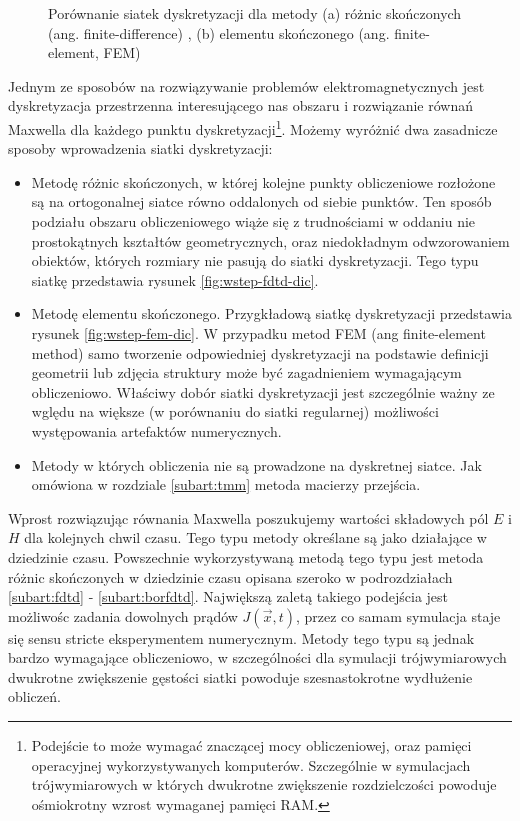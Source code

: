\begin{figure}[tb]
\begin{subfigure}{0.45\textwidth}
	\end{subfigure}
	\caption{Porównanie siatek dyskretyzacji dla metody (a) różnic skończonych (ang. finite-difference) , (b) elementu skończonego (ang. finite-element, FEM)}
\end{figure}

Jednym ze sposobów na rozwiązywanie problemów elektromagnetycznych jest dyskretyzacja przestrzenna interesującego nas obszaru i rozwiązanie równań Maxwella dla każdego punktu dyskretyzacji\footnote{Podejście to może wymagać znaczącej mocy obliczeniowej, oraz pamięci operacyjnej wykorzystywanych komputerów. Szczególnie w symulacjach trójwymiarowych w których dwukrotne zwiększenie rozdzielczości powoduje ośmiokrotny wzrost wymaganej pamięci RAM. }. Możemy wyróżnić dwa zasadnicze sposoby wprowadzenia siatki dyskretyzacji:
\begin{itemize}
\item Metodę różnic skończonych, w której kolejne punkty obliczeniowe rozłożone są na ortogonalnej siatce równo oddalonych od siebie punktów. Ten sposób podziału obszaru obliczeniowego wiąże się z trudnościami w oddaniu nie prostokątnych kształtów geometrycznych, oraz niedokładnym odwzorowaniem obiektów, których rozmiary nie pasują do siatki dyskretyzacji. Tego typu siatkę przedstawia rysunek \ref{fig:wstep-fdtd-dic}.
\item Metodę elementu skończonego. Przygkładową siatkę dyskretyzacji przedstawia rysunek \ref{fig:wstep-fem-dic}. W przypadku metod  FEM (ang finite-element method) samo tworzenie odpowiedniej dyskretyzacji na podstawie definicji geometrii lub zdjęcia struktury może być zagadnieniem wymagającym obliczeniowo. Właściwy dobór siatki dyskretyzacji jest szczególnie ważny ze wględu na większe (w porównaniu do siatki regularnej) możliwości występowania artefaktów numerycznych.  
\item Metody w których obliczenia nie są prowadzone na dyskretnej siatce. Jak omówiona w rozdziale \ref{subart:tmm} metoda macierzy przejścia.
\end{itemize}

Wprost rozwiązując równania Maxwella poszukujemy wartości składowych pól $E$ i $H$ dla kolejnych chwil czasu. Tego typu metody określane są jako działające w dziedzinie czasu. Powszechnie wykorzystywaną metodą tego typu jest metoda różnic skończonych w dziedzinie czasu opisana szeroko w podrozdziałach \ref{subart:fdtd} - \ref{subart:borfdtd}. Największą zaletą takiego podejścia jest możliwośc zadania dowolnych prądów $J(\vec{x},t)$, przez co samam symulacja staje się sensu stricte eksperymentem numerycznym. Metody tego typu są jednak bardzo wymagające obliczeniowo, w szczególności dla symulacji trójwymiarowych dwukrotne zwiększenie gęstości siatki powoduje szesnastokrotne wydłużenie obliczeń. 

